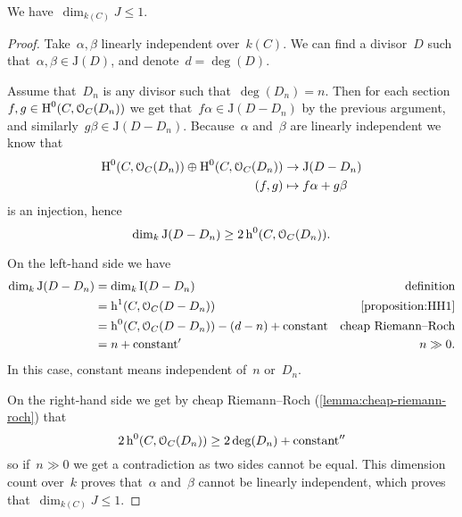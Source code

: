 \documentclass[10pt,a4paper]{article}
\begin{document}
\begin{lemma}
  \label{lemma:dim(J)<=1}
  We have~$\dim_{k(C)}J\leq 1$.
  \begin{proof}
    Take~$\alpha,\beta$ linearly independent over~$k(C)$. We can find a divisor~$D$ such that~$\alpha,\beta\in\mathrm{J}(D)$, and denote~$d=\deg(D)$.

    Assume that~$D_n$ is any divisor such that~$\deg(D_n)=n$. Then for each section $f,g\in\operatorname{H}^0(C,\mathcal{O}_C(D_n))$ we get that~$f\alpha\in\mathrm{J}(D-D_n)$ by the previous argument, and similarly~$g\beta\in\mathrm{J}(D-D_n)$. Because~$\alpha$ and~$\beta$ are linearly independent we know that
    \begin{equation}
      \begin{aligned}
        \operatorname{H}^0(C,\mathcal{O}_C(D_n))\oplus\operatorname{H}^0(C,\mathcal{O}_C(D_n))&\to\mathrm{J}(D-D_n) \\
        (f,g)&\mapsto f\alpha+g\beta
      \end{aligned}
    \end{equation}
    is an injection, hence
    \begin{equation}
      \dim_k\mathrm{J}(D-D_n)\geq 2\operatorname{h}^0(C,\mathcal{O}_C(D_n)).
    \end{equation}

    On the left-hand side we have
    \begin{equation}
      \begin{aligned}
        \dim_k\mathrm{J}(D-D_n)&=\dim_k\mathrm{I}(D-D_n) & \text{definition} \\
        &=\hh^1(C,\mathcal{O}_C(D-D_n)) & \text{\cref{proposition:HH1}} \\
        &=\hh^0(C,\mathcal{O}_C(D-D_n))-(d-n)+\text{constant} & \text{cheap Riemann--Roch} \\
        &=n+\text{constant}' & n\gg 0.
      \end{aligned}
    \end{equation}
    In this case, constant means independent of~$n$ or~$D_n$.

    On the right-hand side we get by cheap Riemann--Roch (\cref{lemma:cheap-riemann-roch}) that
    \begin{equation}
      2\operatorname{h}^0(C,\mathcal{O}_C(D_n))\geq 2\deg(D_n)+\text{constant}''
    \end{equation}
    so if~$n\gg 0$ we get a contradiction as two sides cannot be equal. This dimension count over~$k$ proves that~$\alpha$ and~$\beta$ cannot be linearly independent, which proves that~$\dim_{k(C)}J\leq 1$.
  \end{proof}
\end{lemma}
\end{document}
